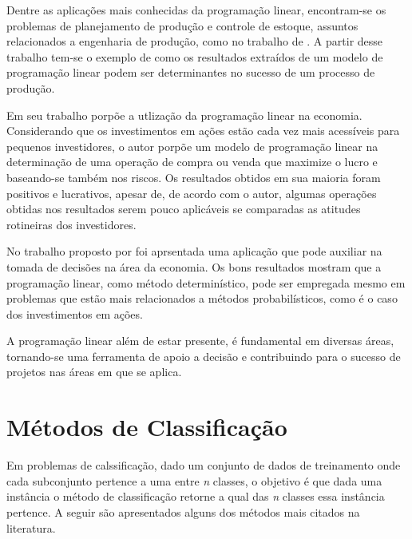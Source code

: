 Dentre as aplicações mais conhecidas da programação linear, encontram-se os problemas de planejamento de produção e controle de estoque, assuntos relacionados a engenharia de produção, como no trabalho de . A partir desse trabalho tem-se o exemplo de como os resultados extraídos de um modelo de programação linear podem ser determinantes no sucesso de um processo de produção.

Em seu trabalho  porpõe a utlização da programação linear na economia. Considerando que os investimentos em ações estão cada vez mais acessíveis para pequenos investidores, o autor porpõe um modelo de programação linear na determinação de uma operação de compra ou venda que maximize o lucro e baseando-se também nos riscos. Os resultados obtidos em sua maioria foram positivos e lucrativos, apesar de, de acordo com o autor, algumas operações obtidas nos resultados serem pouco aplicáveis se comparadas as atitudes rotineiras dos investidores.

No trabalho proposto por \cite{Krukoski2010Economia} foi aprsentada uma aplicação que pode auxiliar na tomada de decisões na área da economia. Os bons resultados mostram que a programação linear, como método determinístico, pode ser empregada mesmo em problemas que estão mais relacionados a métodos probabilísticos, como é o caso dos investimentos em ações.

A programação linear além de estar presente, é fundamental em diversas áreas, tornando-se uma ferramenta de apoio a decisão e contribuindo para o sucesso de projetos nas áreas em que se aplica.

\section{Métodos de Classificação}
Em problemas de calssificação, dado um conjunto de dados de treinamento onde cada subconjunto pertence a uma entre \textit{n} classes, o objetivo é que dada uma instância o método de classificação retorne a qual das \textit{n} classes essa instância pertence. A seguir são apresentados alguns dos métodos mais citados na literatura. 

